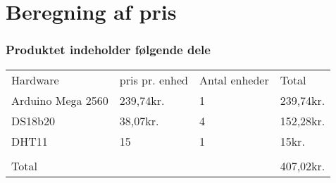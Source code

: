 \section{Beregning af pris}
\subsubsection{Produktet indeholder følgende dele}  



\begin{tabular}{ |p{3cm}||p{3cm}|p{3cm}|p{3cm}|  }
 \hline
 \rowcolor{lightgray}\multicolumn{4}{|c|}{Pris beregning} \\
 \hline
 Hardware    & pris pr. enhed &Antal enheder&Total\\
 \hline
 Arduino Mega 2560   & 239,74kr.    &1&   239,74kr.\\
 \hline
 DS18b20&   38,07kr.  & 4   &152,28kr.\\
 \hline
 DHT11 &15 & 1&  15kr.\\
 \hline
 		&	&	&\\
 \hline
 Total	&	&	&407,02kr.\\
 \hline 
\end{tabular}


